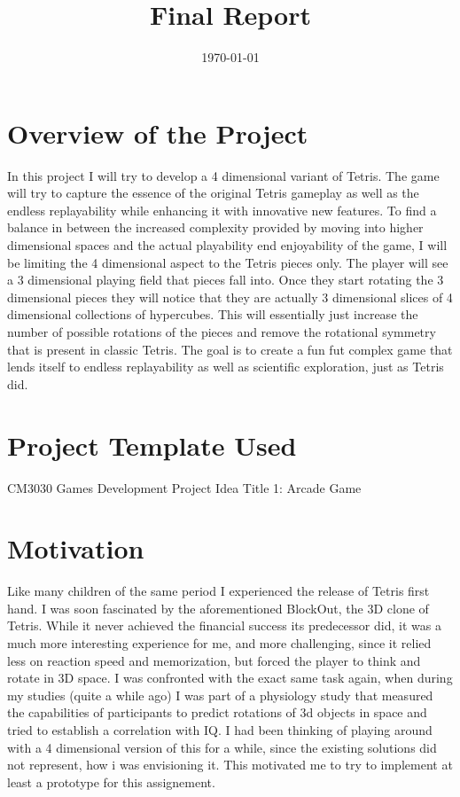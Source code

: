 \documentclass{article}
\title{Final Report}
\date{\today}
\begin{document}
\maketitle
\newpage
\tableofcontents   
\section{Overview of the Project}

In this project I will try to develop a 4 dimensional variant of Tetris. The game will try to capture the essence of the original Tetris gameplay as well as the endless replayability while enhancing it with innovative new features. To find a balance in between the increased complexity provided by moving into higher dimensional spaces and the actual playability end enjoyability of the game, I will be limiting the 4 dimensional aspect to the Tetris pieces only. The player will see a 3 dimensional playing field that pieces fall into. Once they start rotating the 3 dimensional pieces they will notice that they are actually 3 dimensional slices of 4 dimensional collections of hypercubes. This will essentially just increase the number of possible rotations of the pieces and remove the rotational symmetry that is present in classic Tetris.
The goal is to create a fun fut complex game that lends itself to endless replayability as well as scientific exploration, just as Tetris did.

\section{Project Template Used}
CM3030 Games Development Project Idea Title 1: Arcade Game

\section{Motivation}
Like many children of the same period I experienced the release of Tetris first hand. I was soon fascinated by the aforementioned BlockOut, the 3D clone of Tetris. While it never achieved the financial success its predecessor did, it was a much more interesting experience for me, and more challenging, since it relied less on reaction speed and memorization, but forced the player to think and rotate in 3D space. I was confronted with the exact same task again, when during my studies (quite a while ago) I was part of a physiology study that measured the capabilities of participants to predict rotations of 3d objects in space and tried to establish a correlation with IQ. 
I had been thinking of playing around with a 4 dimensional version of this for a while, since the existing solutions did not represent, how i was envisioning it. This motivated me to try to implement at least a prototype for this assignement.
\end{document}
